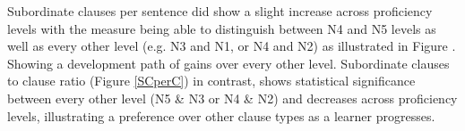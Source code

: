 
Subordinate clauses per sentence did show a slight increase across proficiency levels with the measure being able to
distinguish between N4 and N5 levels as well as every other level (e.g. N3 and N1, or N4 and N2) as illustrated in
Figure \cite{fig:SubclperS}. Showing a development
path of gains over every other level. Subordinate clauses to clause ratio (Figure \ref{SCperC}) in contrast, shows statistical 
significance between every other level (N5 & N3 or N4 & N2) and decreases across proficiency
levels, illustrating a preference over other clause types as a learner progresses.

